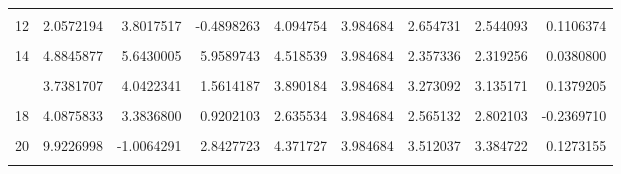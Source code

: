 \documentclass[]{tufte-handout}
\begin{document}
\begin{table}
{\begin{tabular}[t]{rrrrrrrrr}
\addlinespace
\cellcolor{gray!6}{11} & \cellcolor{gray!6}{1.7516972} & \cellcolor{gray!6}{3.8582515} & \cellcolor{gray!6}{5.4316160} & \cellcolor{gray!6}{4.191824} & \cellcolor{gray!6}{3.984684} & \cellcolor{gray!6}{2.051548} & \cellcolor{gray!6}{1.975100} & \cellcolor{gray!6}{0.0764484}\\
12 & 2.0572194 & 3.8017517 & -0.4898263 & 4.094754 & 3.984684 & 2.654731 & 2.544093 & 0.1106374\\
\cellcolor{gray!6}{13} & \cellcolor{gray!6}{5.4974431} & \cellcolor{gray!6}{4.7694066} & \cellcolor{gray!6}{5.0203960} & \cellcolor{gray!6}{4.067797} & \cellcolor{gray!6}{3.984684} & \cellcolor{gray!6}{2.769818} & \cellcolor{gray!6}{2.653201} & \cellcolor{gray!6}{0.1166171}\\
14 & 4.8845877 & 5.6430005 & 5.9589743 & 4.518539 & 3.984684 & 2.357336 & 2.319256 & 0.0380800\\
\cellcolor{gray!6}{15} & \cellcolor{gray!6}{1.2769413} & \cellcolor{gray!6}{0.7777181} & \cellcolor{gray!6}{1.3530467} & \cellcolor{gray!6}{3.070003} & \cellcolor{gray!6}{3.984684} & \cellcolor{gray!6}{3.606769} & \cellcolor{gray!6}{3.572304} & \cellcolor{gray!6}{0.0344647}\\
\addlinespace
16 & 3.7381707 & 4.0422341 & 1.5614187 & 3.890184 & 3.984684 & 3.273092 & 3.135171 & 0.1379205\\
\cellcolor{gray!6}{17} & \cellcolor{gray!6}{2.1633681} & \cellcolor{gray!6}{2.0131472} & \cellcolor{gray!6}{5.2402933} & \cellcolor{gray!6}{2.985413} & \cellcolor{gray!6}{3.984684} & \cellcolor{gray!6}{2.712794} & \cellcolor{gray!6}{2.782898} & \cellcolor{gray!6}{-0.0701041}\\
18 & 4.0875833 & 3.3836800 & 0.9202103 & 2.635534 & 3.984684 & 2.565132 & 2.802103 & -0.2369710\\
\cellcolor{gray!6}{19} & \cellcolor{gray!6}{1.4154756} & \cellcolor{gray!6}{5.2815788} & \cellcolor{gray!6}{6.8912748} & \cellcolor{gray!6}{4.331742} & \cellcolor{gray!6}{3.984684} & \cellcolor{gray!6}{1.990321} & \cellcolor{gray!6}{1.936934} & \cellcolor{gray!6}{0.0533872}\\
20 & 9.9226998 & -1.0064291 & 2.8427723 & 4.371727 & 3.984684 & 3.512037 & 3.384722 & 0.1273155\\
\addlinespace
\cellcolor{gray!6}{21} & \cellcolor{gray!6}{5.6160721} & \cellcolor{gray!6}{4.1564319} & \cellcolor{gray!6}{10.5469797} & \cellcolor{gray!6}{4.786439} & \cellcolor{gray!6}{3.984684} & \cellcolor{gray!6}{3.441183} & \cellcolor{gray!6}{3.390832} & \cellcolor{gray!6}{0.0503512}\\

\end{tabular}}
\end{table}
\end{document}
